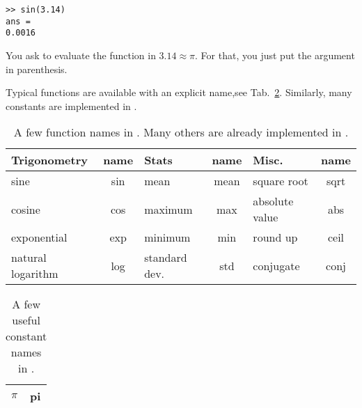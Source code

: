 \begin{lstlisting}
>> sin(3.14)
ans =
0.0016
\end{lstlisting}

You ask \matlab to evaluate the function  in $3.14\approx \pi$. 
For that, you just put the argument in parenthesis.


Typical functions are available with an explicit name,see Tab.~\ref{tab-func}. Similarly, many constants are implemented in \matlab.

\begin{table}[h!]
	\caption{A few function names in \matlab. Many others are already implemented in \matlab.}
	\label{tab-func}
\center
\begin{tabular}{|l|c||l|c||l|c|}
	\hline
	Trigonometry & name & Stats & name & Misc. & name\\
	\hline
	sine & sin  &
		mean & mean &
			square root & sqrt \\
			
	cosine & cos &
		maximum & max &
			absolute value & abs \\

	exponential & exp &
		minimum & min &
			round up & ceil \\		

		
	natural logarithm & log &
		standard dev. & std &
			conjugate & conj \\
	
	\hline
\end{tabular}
\end{table}

\begin{table}[h!]
	\caption{A few useful constant names in \matlab.}
	\label{tab-func}
\center
\begin{tabular}{|l|c|}
	\hline
	$\pi$ & pi \\

	\hline
\end{tabular}
\end{table}

\subsection{}


















